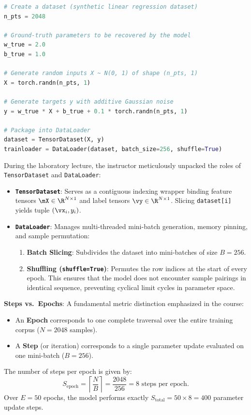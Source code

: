 \documentclass[../labs.tex]{subfiles}
\begin{document}
\begin{lstlisting}[language=Python, caption={Verified solution for synthetic dataset generation (Cell 22).}, label={lst:lab01_synthetic_dataset}]
# Create a dataset (synthetic linear regression dataset)
n_pts = 2048

# Ground-truth parameters to be recovered by the model
w_true = 2.0
b_true = 1.0

# Generate random inputs X ~ N(0, 1) of shape (n_pts, 1)
X = torch.randn(n_pts, 1)

# Generate targets y with additive Gaussian noise
y = w_true * X + b_true + 0.1 * torch.randn(n_pts, 1)

# Package into DataLoader
dataset = TensorDataset(X, y)
trainloader = DataLoader(dataset, batch_size=256, shuffle=True)
\end{lstlisting}

\begin{deepdive}
During the laboratory lecture, the instructor meticulously unpacked the roles of \texttt{TensorDataset} and \texttt{DataLoader}:
\begin{itemize}
    \item \textbf{\texttt{TensorDataset}}: Serves as a contiguous indexing wrapper binding feature tensors $\mX \in \R^{N \times 1}$ and label tensors $\vy \in \R^{N \times 1}$. Slicing \texttt{dataset[i]} yields tuple $(\vx_i, y_i)$.
    \item \textbf{\texttt{DataLoader}}: Manages multi-threaded mini-batch generation, memory pinning, and sample permutation:
    \begin{enumerate}
        \item \textbf{Batch Slicing}: Subdivides the dataset into mini-batches of size $B = 256$.
        \item \textbf{Shuffling (\texttt{shuffle=True})}: Permutes the row indices at the start of every epoch. This ensures that the model does not encounter sample pairings in identical sequence, preventing cyclical limit cycles in parameter space.
    \end{enumerate}
\end{itemize}

\textbf{Steps vs.\ Epochs}: A fundamental metric distinction emphasized in the course:
\begin{itemize}
    \item An \textbf{Epoch} corresponds to one complete traversal over the entire training corpus ($N = 2048$ samples).
    \item A \textbf{Step} (or iteration) corresponds to a single parameter update evaluated on one mini-batch ($B = 256$).
\end{itemize}
The number of steps per epoch is given by:
\begin{equation}
S_{\text{epoch}} = \left\lceil \frac{N}{B} \right\rceil = \frac{2048}{256} = 8 \text{ steps per epoch}.
\end{equation}
Over $E = 50$ epochs, the model performs exactly $S_{\text{total}} = 50 \times 8 = 400$ parameter update steps.
\end{deepdive}
\end{document}
